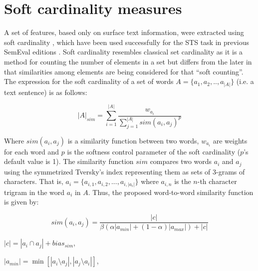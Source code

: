 
\section{Soft cardinality measures}
\label{sec:softcard}

A set of features, based only on surface text information,
were extracted using soft cardinality \cite{chavez_text_2010}, which
have been used successfully for the STS task in previous SemEval editions
\cite{jimenez_soft_2012,jimenez_softcardinality_core:_2013}. Soft
cardinality resembles classical set cardinality as it is a method
for counting the number of elements in a set but differs from the
later in that similarities among elements are being considered for
that ``soft counting''. The expression for the soft cardinality of a set of words $A=\{a_{1},a_{2},..,a_{|A|}\}$
(i.e. a text sentence) is as follows:

\begin{equation}
|A|_{sim}=\sum_{i=1}^{|A|}\frac{w_{a_{i}}}{\sum_{j=1}^{|A|}sim(a_{i},a_{j})^{p}}\label{eq:soft_card}
\end{equation}


Where $sim(a_{i},a_{j})$ is a similarity function between two words,
$w_{a_{i}}$ are weights for each word and $p$ is the softness control
parameter of the soft cardinality ($p$'s default value is 1). The
similarity function $sim$ compares two words $a_{i}$ and $a_{j}$
using the symmetrized Tversky's index \cite{tversky_features_1977,jimenez_softcardinality-core:_2013}
representing them as sets of 3-grams of characters. That is, $a_{i}=\{a_{i,1},a_{i,2},...,a_{i,|a_{i}|}\}$
where $a_{i,n}$ is the $n$-th character trigram in the word $a_{i}$
in $A$. Thus, the proposed word-to-word similarity function is given
by:

\begin{center}
\begin{equation}
sim(a_{i},a_{j})=\frac{|c|}{\beta(\alpha|a_{min}|+(1-\alpha)|a_{max}|)+|c|}\label{eq:symm_tversky}
\end{equation}

\par\end{center}

\begin{center}
$|c|=|a_{i}\cap a_{j}|+bias_{sim}$,
\par\end{center}

\begin{center}
$|a_{min}|=\min[|a_{i}\setminus a_{j}|,|a_{j}\setminus a_{i}|]$,
\par\end{center}

